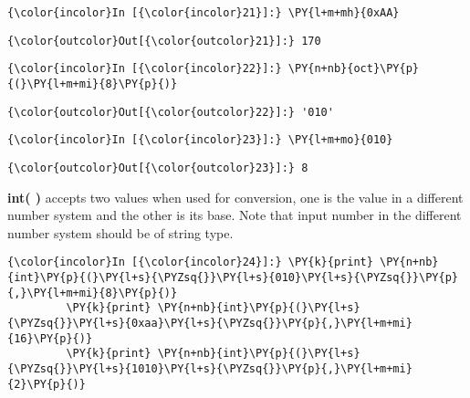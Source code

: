     \begin{Verbatim}[commandchars=\\\{\}]
{\color{incolor}In [{\color{incolor}21}]:} \PY{l+m+mh}{0xAA}
\end{Verbatim}

            \begin{Verbatim}[commandchars=\\\{\}]
{\color{outcolor}Out[{\color{outcolor}21}]:} 170
\end{Verbatim}
        
    \begin{Verbatim}[commandchars=\\\{\}]
{\color{incolor}In [{\color{incolor}22}]:} \PY{n+nb}{oct}\PY{p}{(}\PY{l+m+mi}{8}\PY{p}{)}
\end{Verbatim}

            \begin{Verbatim}[commandchars=\\\{\}]
{\color{outcolor}Out[{\color{outcolor}22}]:} '010'
\end{Verbatim}
        
    \begin{Verbatim}[commandchars=\\\{\}]
{\color{incolor}In [{\color{incolor}23}]:} \PY{l+m+mo}{010}
\end{Verbatim}

            \begin{Verbatim}[commandchars=\\\{\}]
{\color{outcolor}Out[{\color{outcolor}23}]:} 8
\end{Verbatim}
        
    \textbf{int( )} accepts two values when used for conversion, one is the
value in a different number system and the other is its base. Note that
input number in the different number system should be of string type.

    \begin{Verbatim}[commandchars=\\\{\}]
{\color{incolor}In [{\color{incolor}24}]:} \PY{k}{print} \PY{n+nb}{int}\PY{p}{(}\PY{l+s}{\PYZsq{}}\PY{l+s}{010}\PY{l+s}{\PYZsq{}}\PY{p}{,}\PY{l+m+mi}{8}\PY{p}{)}
         \PY{k}{print} \PY{n+nb}{int}\PY{p}{(}\PY{l+s}{\PYZsq{}}\PY{l+s}{0xaa}\PY{l+s}{\PYZsq{}}\PY{p}{,}\PY{l+m+mi}{16}\PY{p}{)}
         \PY{k}{print} \PY{n+nb}{int}\PY{p}{(}\PY{l+s}{\PYZsq{}}\PY{l+s}{1010}\PY{l+s}{\PYZsq{}}\PY{p}{,}\PY{l+m+mi}{2}\PY{p}{)}
\end{Verbatim}

